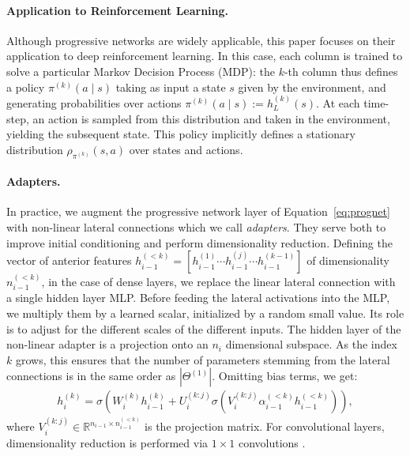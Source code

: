 \paragraph{Application to Reinforcement Learning.} Although progressive
networks are widely applicable, this paper focuses on their application to
deep reinforcement learning. In this case, each column is trained to solve a
particular Markov Decision Process (MDP): the $k$-th column thus defines a policy
$\pi^{(k)}(a\mid s)$ taking as input a state $s$ given by the environment,
and generating probabilities over actions $\pi^{(k)}(a\mid s) := h_L^{(k)}(s)$.
At each time-step, an action is sampled from this distribution and taken in the
environment, yielding the subsequent state. This policy implicitly defines a
stationary distribution $\rho_{\pi^{(k)}}(s,a)$ over states and actions.

\paragraph{Adapters.}
In practice, we augment the progressive network layer of Equation~\ref{eq:prognet} with
non-linear lateral connections which we call \textit{adapters}. They serve
both to improve initial conditioning and perform dimensionality reduction.
Defining the vector of anterior features
$h_{i-1}^{(<k)} = [h_{i-1}^{(1)} \cdots h_{i-1}^{(j)} \cdots h_{i-1}^{(k-1)}]$
of dimensionality $n_{i-1}^{(<k)}$, in the case of dense layers,
we replace the linear lateral connection with a single hidden layer MLP.
Before feeding the lateral activations into the MLP, we multiply them by a learned scalar,
initialized by a random small value.
Its role is to adjust for the different scales of the different inputs.
The hidden layer of the non-linear adapter is a projection onto an $n_{i}$ dimensional
subspace.  As the
index $k$ grows, this ensures that the number of parameters stemming from the
lateral connections is in the same order as $\left|\Theta^{(1)} \right|$. Omitting bias
terms, we get:
\begin{align}
  \label{eq:prognet}
  h_i^{(k)} = \sigma \left( W_i^{(k)} h_{i-1}^{(k)} + U_{i}^{(k:j)} \sigma(V_{i}^{(k:j)} \alpha_{i-1}^{(<k)} h_{i-1}^{(<k)}) \right),
\end{align}
where $V_{i}^{(k:j)} \in \mathbb{R}^{n_{i-1} \times n_{i-1}^{(<k)}}$ is the projection
matrix. For convolutional layers, dimensionality reduction is
performed via $1\times 1$ convolutions \cite{LinCY13}.


